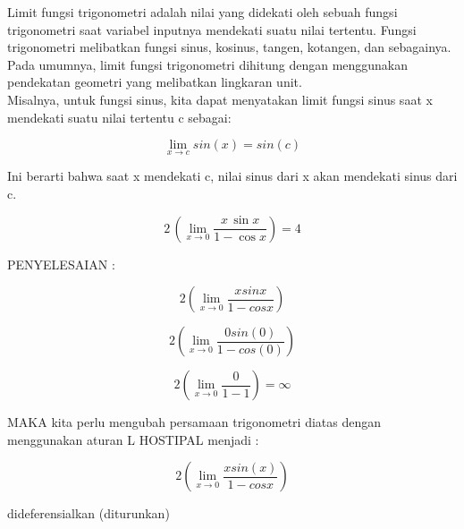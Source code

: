 \documentclass[a4paper,10pt]{article}
\begin{document}
\begin{eulernotebook}
\begin{eulercomment}
\begin{eulercomment}
\begin{eulercomment}
\begin{eulercomment}
\begin{eulercomment}
\begin{eulercomment}
\begin{eulercomment}
\begin{eulercomment}
\begin{eulercomment}
\begin{eulercomment}
\begin{eulercomment}
Limit fungsi trigonometri adalah nilai yang didekati oleh sebuah
fungsi trigonometri saat variabel inputnya mendekati suatu nilai
tertentu. Fungsi trigonometri melibatkan fungsi sinus, kosinus,
tangen, kotangen, dan sebagainya. Pada umumnya, limit fungsi
trigonometri dihitung dengan menggunakan pendekatan geometri yang
melibatkan lingkaran unit.\\
Misalnya, untuk fungsi sinus, kita dapat menyatakan limit fungsi sinus
saat x mendekati suatu nilai tertentu c sebagai:

\end{eulercomment}
\begin{eulerformula}
\[
\lim_{x \to c} sin(x) = sin(c)
\]
\end{eulerformula}
\begin{eulercomment}
Ini berarti bahwa saat x mendekati c, nilai sinus dari x akan
mendekati sinus dari c.
\end{eulercomment}
\begin{eulerformula}
\[
2\,\left(\lim_{x\rightarrow 0}{\frac{x\,\sin x}{1-\cos x}}\right)=4
\]
\end{eulerformula}
\begin{eulercomment}
PENYELESAIAN :\\
\end{eulercomment}
\begin{eulerformula}
\[
2( \lim \limits_{x \to 0} \frac{xsinx}{1-cosx} )
\]
\end{eulerformula}
\begin{eulerformula}
\[
2( \lim \limits_{x \to 0} \frac{0sin(0)}{1-cos(0)} )
\]
\end{eulerformula}
\begin{eulerformula}
\[
2( \lim \limits_{x \to 0} \frac{0}{1-1} ) = \infty
\]
\end{eulerformula}
\begin{eulercomment}
MAKA kita perlu mengubah persamaan trigonometri diatas dengan
menggunakan aturan L HOSTIPAL menjadi :\\
\end{eulercomment}
\begin{eulerformula}
\[
2( \lim \limits_{x \to 0} \frac{xsin(x)}{1-cosx} )
\]
\end{eulerformula}
\begin{eulercomment}
dideferensialkan (diturunkan)\\

\end{eulercomment}
\end{eulercomment}
\end{eulercomment}
\end{eulercomment}
\end{eulercomment}
\end{eulercomment}
\end{eulercomment}
\end{eulercomment}
\end{eulercomment}
\end{eulercomment}
\end{eulercomment}
\end{eulernotebook}
\end{document}
